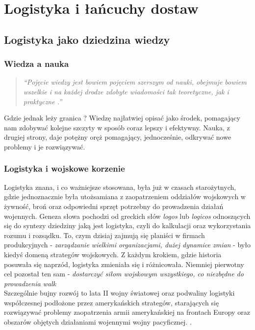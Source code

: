 \chapter{Logistyka i łańcuchy dostaw}
\label{c2:c2}

\section{Logistyka jako dziedzina wiedzy}
	\subsection{Wiedza a nauka}	
		\begin{quote}
			\textit{
				``Pojęcie wiedzy jest bowiem pojęciem szerszym od nauki,
				obejmuje bowiem wszelkie i na każdej drodze zdobyte wiadomości
				tak teoretyczne, jak i praktyczne \cite{organizacja_badan_ocen_prac_naukowych}.''
			}
		\end{quote}
		
		Gdzie jednak leży granica ? Wiedzę najłatwiej opisać jako środek, pomagający 
		nam zdobywać kolejne szczyty w sposób coraz lepszy i efektywny. Nauka, z drugiej strony,
		daje potężny oręż pomagający, jednocześnie, odkrywać nowe problemy i je rozwiązywać.
		
	\subsection{Logistyka i wojskowe korzenie}
		Logistyka znana, i co ważniejsze stosowana, była już w czasach starożytnych, gdzie jednoznacznie
		była utożsamiana z zaopatrzeniem oddziałów wojskowych w żywność, broń oraz odpowiedni
		sprzęt potrzebny do prowadzenia działań wojennych. Geneza słowa pochodzi od greckich
		słów \emph{logos} lub \emph{logicos} odnoszących się do syntezy dziedziny jaką jest logistyka,
		czyli do kalkulacji oraz wykorzystania rozumu i rozsądku. To, czym dzisiaj zajmują się planiści w 
		firmach produkcyjnych - \emph{zarządzanie wielkimi organizacjami, dużej dynamice zmian} - było kiedyś 
		domeną strategów wojskowych. Z każdym krokiem, gdzie historia posuwała
		się naprzód, logistyka zmieniała się i różnicowała. Niemniej pierwotny cel pozostał ten sam - 
		\emph{dostarczyć siłom wojskowym wszystkiego, co niezbędne do prowadzenia walk} \\
		
		Szczególnie bujny rozwój to lata II wojny światowej oraz podwaliny logistyki współczesnej
		podłożone przez amerykańskich strategów, starających się rozwiązywać problemy zaopatrzenia
		armii amerykańskiej na frontach Europy oraz obszarów objętych działaniami wojennymi wojny pacyficznej. 
		\cite{logistyka_w_przedsiebiorstwie}\cite{logistyka_jako_dziedzina_wiedzy_cz1}.
		

